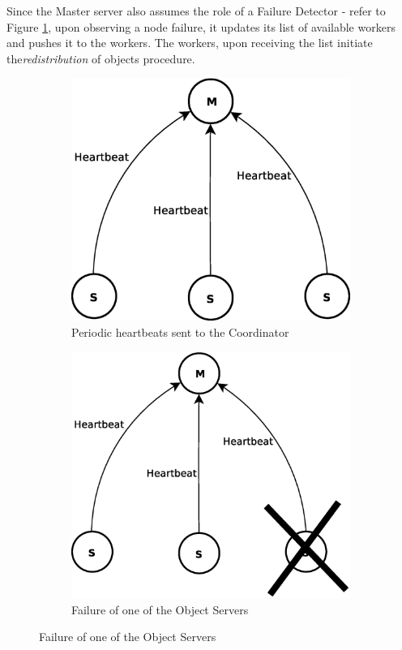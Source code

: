 \documentclass[times, 10pt,twocolumn]{article}
\begin{document}
\label{subsec:grmemb}
Since the Master server also assumes the role of a Failure Detector - refer to Figure \ref{fig:heart},
 upon observing a node failure, it updates its list of available workers and pushes it to the workers.
 The workers, upon receiving the list initiate the{\it redistribution} of objects procedure. 


\begin{figure}
    \centering
    \begin{subfigure}[b]{0.3\textwidth}
        \includegraphics[scale=0.2]{heartbeat.eps}
        \caption{Periodic heartbeats sent to the Coordinator}
        \label{fig:heart}
    \end{subfigure}

    \begin{subfigure}[b]{0.3\textwidth}
        \includegraphics[scale=0.2]{failure.eps}
        \caption{Failure of one of the Object Servers}
        \label{fig:fail}
    \end{subfigure}
  

\end{figure}
\end{document}
